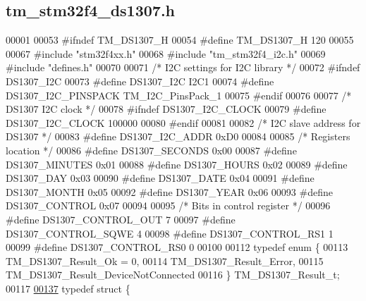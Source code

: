 \hypertarget{tm__stm32f4__ds1307_8h_source}{}\subsection{tm\+\_\+stm32f4\+\_\+ds1307.\+h}

\begin{DoxyCode}
00001 
00053 \textcolor{preprocessor}{#ifndef TM\_DS1307\_H}
00054 \textcolor{preprocessor}{#define TM\_DS1307\_H 120}
00055 
00067 \textcolor{preprocessor}{#include "stm32f4xx.h"}
00068 \textcolor{preprocessor}{#include "tm\_stm32f4\_i2c.h"}
00069 \textcolor{preprocessor}{#include "defines.h"}
00070 
00071 \textcolor{comment}{/* I2C settings for I2C library */}
00072 \textcolor{preprocessor}{#ifndef DS1307\_I2C}
00073 \textcolor{preprocessor}{#define DS1307\_I2C                  I2C1}
00074 \textcolor{preprocessor}{#define DS1307\_I2C\_PINSPACK         TM\_I2C\_PinsPack\_1}
00075 \textcolor{preprocessor}{#endif}
00076 
00077 \textcolor{comment}{/* DS1307 I2C clock */}
00078 \textcolor{preprocessor}{#ifndef DS1307\_I2C\_CLOCK}
00079 \textcolor{preprocessor}{#define DS1307\_I2C\_CLOCK            100000}
00080 \textcolor{preprocessor}{#endif}
00081 
00082 \textcolor{comment}{/* I2C slave address for DS1307 */}
00083 \textcolor{preprocessor}{#define DS1307\_I2C\_ADDR             0xD0}
00084 
00085 \textcolor{comment}{/* Registers location */}
00086 \textcolor{preprocessor}{#define DS1307\_SECONDS              0x00}
00087 \textcolor{preprocessor}{#define DS1307\_MINUTES              0x01}
00088 \textcolor{preprocessor}{#define DS1307\_HOURS                0x02}
00089 \textcolor{preprocessor}{#define DS1307\_DAY                  0x03}
00090 \textcolor{preprocessor}{#define DS1307\_DATE                 0x04}
00091 \textcolor{preprocessor}{#define DS1307\_MONTH                0x05}
00092 \textcolor{preprocessor}{#define DS1307\_YEAR                 0x06}
00093 \textcolor{preprocessor}{#define DS1307\_CONTROL              0x07}
00094 
00095 \textcolor{comment}{/* Bits in control register */}
00096 \textcolor{preprocessor}{#define DS1307\_CONTROL\_OUT          7}
00097 \textcolor{preprocessor}{#define DS1307\_CONTROL\_SQWE         4}
00098 \textcolor{preprocessor}{#define DS1307\_CONTROL\_RS1          1}
00099 \textcolor{preprocessor}{#define DS1307\_CONTROL\_RS0          0}
00100 
00112 \textcolor{keyword}{typedef} \textcolor{keyword}{enum} \{
00113     TM\_DS1307\_Result\_Ok = 0,
00114     TM\_DS1307\_Result\_Error,
00115     TM\_DS1307\_Result\_DeviceNotConnected
00116 \} TM\_DS1307\_Result\_t;
00117 
\hypertarget{tm__stm32f4__ds1307_8h_source_l00137}{}\hyperlink{struct_t_m___d_s1307___time__t}{00137} \textcolor{keyword}{typedef} \textcolor{keyword}{struct }\{

\end{DoxyCode}
